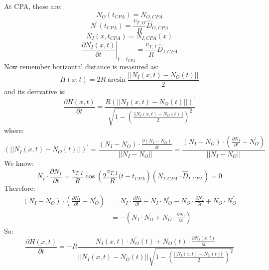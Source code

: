 At CPA, these are:
\begin{equation}
    N_{O}(t_{CPA}) = N_{O,CPA}
\end{equation}
\begin{equation}
    N^{'}(t_{CPA}) = \frac{v_{T,O}}{R}\hat{D}_{O,CPA}
\end{equation}
\begin{equation}
    N_{I}(x,t_{CPA}) = N_{I,CPA}(x) 
\end{equation}
\begin{equation}
    \left. \frac{\partial N_{I}(x,t)}{\partial t} \right|_{t=t_{CPA}} = \frac{v_{T,I}}{R}\hat{D}_{I,CPA}
\end{equation}
Now remember horizontal distance is measured as:
\begin{equation}
    H(x,t) = 2R\arcsin{\frac{||N_{I}(x,t)-N_{O}(t)||}{2}}
\end{equation}
and its derivative is:
\begin{equation}
    \frac{\partial H(x,t)}{\partial t} = \frac{R(||N_{I}(x,t)-N_{O}(t)||)^{'}}{\sqrt{1-\left( \frac{||N_{I}(x,t)-N_{O}(t)||}{2} \right)^{2}}}
\end{equation}
where:
\begin{equation}
    (||N_{I}(x,t)-N_{O}(t)||)^{'} = \frac{(N_{I}-N_{O}) \cdot \frac{\partial (N_{I}-N_{O})}{\partial t}}{||N_{I}-N_{O}||} = \frac{(N_{I}-N_{O}) \cdot \left( \frac{\partial N_{I}}{\partial t} - N^{'}_{O}\right)}{||N_{I}-N_{O}||}
\end{equation}
We know:
\begin{equation}
    N_{I} \cdot \frac{\partial N_{I}}{\partial t} = \frac{v_{T,I}}{R}\cos{\left( 2\frac{v_{T,I}}{R}(t-t_{CPA} \right)}(N_{I,CPA} \cdot \hat{D}_{I,CPA}) = 0
\end{equation}
Therefore:
\begin{equation}
    \begin{aligned}
        (N_{I}-N_{O}) \cdot \left( \frac{\partial N_{I}}{\partial t} - N^{'}_{O} \right) &= N_{I} \cdot \frac{\partial N_{I}}{\partial t} - N_{I} \cdot N^{'}_{O} - N_{O} \cdot \frac{\partial N_{I}}{\partial t} + N_{O} \cdot N^{'}_{O} \\
        &= - \left( N_{I} \cdot N^{'}_{O} + N_{O} \cdot \frac{\partial N_{I}}{\partial t} \right)
    \end{aligned}
\end{equation}
So:
\begin{equation}
    \frac{\partial H(x,t)}{\partial t} = -R\frac{N_{I}(x,t) \cdot N^{'}_{O}(t) + N_{O}(t) \cdot \frac{\partial N_{I}(x,t)}{\partial t}}{|| N_{I}(x,t) - N_{O}(t) || \sqrt{1 - \left( \frac{|| N_{I}(x,t) - N_{O}(t) ||}{2} \right)^{2}}}
\end{equation}
